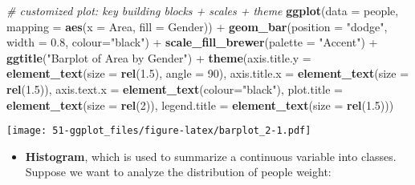 \documentclass[]{book}
\newenvironment{Shaded}{\begin{snugshade}}{\end{snugshade}}
\newcommand{\KeywordTok}[1]{\textcolor[rgb]{0.13,0.29,0.53}{\textbf{{#1}}}}
\newcommand{\DataTypeTok}[1]{\textcolor[rgb]{0.13,0.29,0.53}{{#1}}}
\newcommand{\DecValTok}[1]{\textcolor[rgb]{0.00,0.00,0.81}{{#1}}}
\newcommand{\FloatTok}[1]{\textcolor[rgb]{0.00,0.00,0.81}{{#1}}}
\newcommand{\StringTok}[1]{\textcolor[rgb]{0.31,0.60,0.02}{{#1}}}
\newcommand{\CommentTok}[1]{\textcolor[rgb]{0.56,0.35,0.01}{\textit{{#1}}}}
\newcommand{\NormalTok}[1]{{#1}}
\providecommand{\tightlist}{%
  \setlength{\itemsep}{0pt}\setlength{\parskip}{0pt}}
\def\tightlist{}
\begin{document}
\begin{Shaded}
\begin{Highlighting}[]
\CommentTok{# customized plot: key building blocks + scales + theme}
\KeywordTok{ggplot}\NormalTok{(}\DataTypeTok{data =} \NormalTok{people, }\DataTypeTok{mapping =} \KeywordTok{aes}\NormalTok{(}\DataTypeTok{x =} \NormalTok{Area, }\DataTypeTok{fill =} \NormalTok{Gender)) +}\StringTok{ }
\StringTok{  }\KeywordTok{geom_bar}\NormalTok{(}\DataTypeTok{position =} \StringTok{"dodge"}\NormalTok{, }\DataTypeTok{width =} \FloatTok{0.8}\NormalTok{, }\DataTypeTok{colour=}\StringTok{"black"}\NormalTok{) +}\StringTok{ }
\StringTok{       }\KeywordTok{scale_fill_brewer}\NormalTok{(}\DataTypeTok{palette =} \StringTok{"Accent"}\NormalTok{) +}\StringTok{ }
\StringTok{       }\KeywordTok{ggtitle}\NormalTok{(}\StringTok{"Barplot of Area by Gender"}\NormalTok{) +}\StringTok{ }
\StringTok{       }\KeywordTok{theme}\NormalTok{(}\DataTypeTok{axis.title.y =} \KeywordTok{element_text}\NormalTok{(}\DataTypeTok{size =} \KeywordTok{rel}\NormalTok{(}\FloatTok{1.5}\NormalTok{), }\DataTypeTok{angle =} \DecValTok{90}\NormalTok{), }
             \DataTypeTok{axis.title.x =} \KeywordTok{element_text}\NormalTok{(}\DataTypeTok{size =} \KeywordTok{rel}\NormalTok{(}\FloatTok{1.5}\NormalTok{)),}
             \DataTypeTok{axis.text.x =} \KeywordTok{element_text}\NormalTok{(}\DataTypeTok{colour=}\StringTok{"black"}\NormalTok{),}
             \DataTypeTok{plot.title =} \KeywordTok{element_text}\NormalTok{(}\DataTypeTok{size =} \KeywordTok{rel}\NormalTok{(}\DecValTok{2}\NormalTok{)), }
             \DataTypeTok{legend.title =} \KeywordTok{element_text}\NormalTok{(}\DataTypeTok{size =} \KeywordTok{rel}\NormalTok{(}\FloatTok{1.5}\NormalTok{)))  }
\end{Highlighting}
\end{Shaded}

\texttt{[image: 51-ggplot\_files/figure-latex/barplot\_2-1.pdf]}

\clearpage

\begin{itemize}
\tightlist
\item
  \textbf{Histogram}, which is used to summarize a continuous variable
  into classes. Suppose we want to analyze the distribution of people
  weight:
\end{itemize}

\begin{Shaded}
\end{Shaded}
\end{document}
